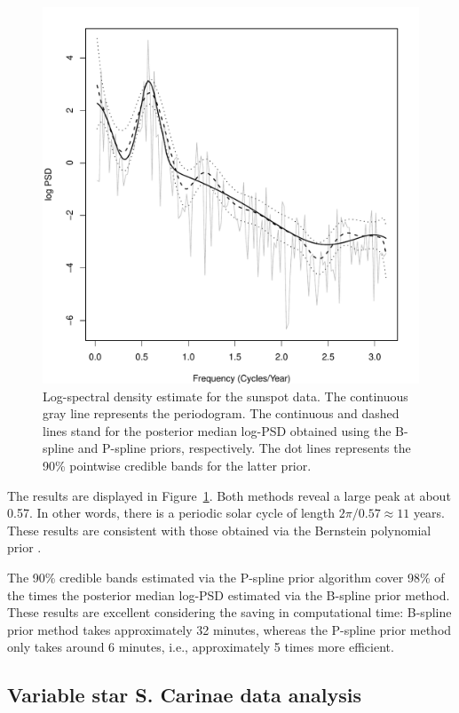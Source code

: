 \documentclass[aps,reprint,amsmath,amssymb,showpacs,showkeys]{revtex4-1}%
\begin{document}
\begin{figure}[]
	\centering
	\includegraphics[scale=0.5,clip=true,angle=0]{sunspot.pdf}
	\caption{Log-spectral density estimate for the sunspot data. The continuous gray line represents the periodogram.  The continuous and dashed lines stand for the posterior median log-PSD obtained using the B-spline and P-spline priors, respectively.  The dot lines represents the 90\% pointwise credible bands for the latter prior.}
	\label{fig:sunspot}
\end{figure}

The results are displayed in Figure~\ref{fig:sunspot}.  Both methods reveal a large peak at about 0.57. In other words, there is a periodic solar cycle of length $2 \pi / 0.57 \approx 11$ years.  These results are consistent with those obtained via the Bernstein polynomial prior \citep{Choudhuri:2004}.

The 90\% credible bands estimated via the P-spline prior algorithm cover 98\% of the times the posterior median log-PSD estimated via the B-spline prior method.  These results are excellent considering the saving in computational time: B-spline prior method takes approximately 32 minutes, whereas the P-spline prior method only takes around 6 minutes, i.e., approximately 5 times more efficient.

\subsection{Variable star S. Carinae data analysis}
\end{document}

